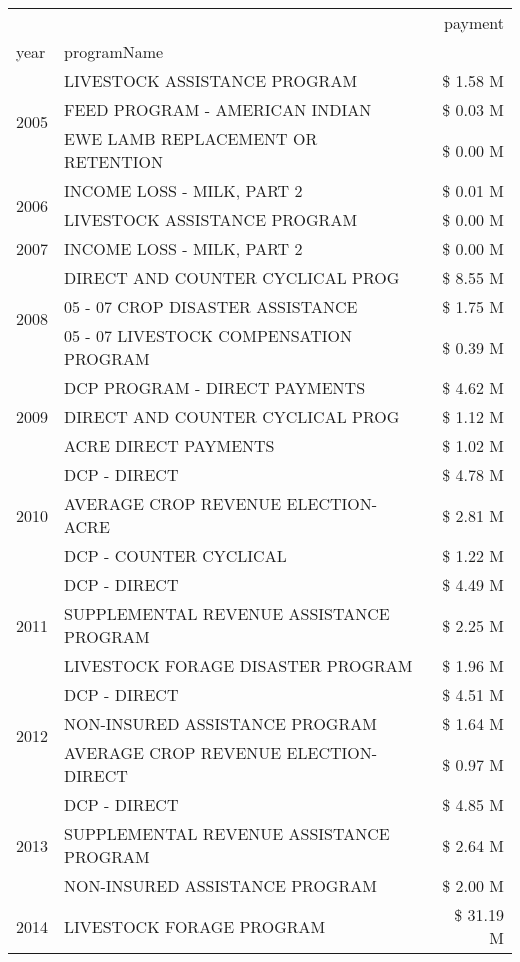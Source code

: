 \begin{tabular}{llr}
\toprule
 &  & payment \\
year & programName &  \\
\midrule
\multirow[t]{3}{*}{2005} & LIVESTOCK ASSISTANCE PROGRAM & \$ 1.58 M \\
 & FEED PROGRAM - AMERICAN INDIAN & \$ 0.03 M \\
 & EWE LAMB REPLACEMENT OR RETENTION & \$ 0.00 M \\
\cline{1-3}
\multirow[t]{2}{*}{2006} & INCOME LOSS - MILK, PART 2 & \$ 0.01 M \\
 & LIVESTOCK ASSISTANCE PROGRAM & \$ 0.00 M \\
\cline{1-3}
2007 & INCOME LOSS - MILK, PART 2 & \$ 0.00 M \\
\cline{1-3}
\multirow[t]{3}{*}{2008} & DIRECT AND COUNTER CYCLICAL PROG & \$ 8.55 M \\
 & 05 - 07 CROP DISASTER ASSISTANCE & \$ 1.75 M \\
 & 05 - 07 LIVESTOCK COMPENSATION PROGRAM & \$ 0.39 M \\
\cline{1-3}
\multirow[t]{3}{*}{2009} & DCP PROGRAM - DIRECT PAYMENTS & \$ 4.62 M \\
 & DIRECT AND COUNTER CYCLICAL PROG & \$ 1.12 M \\
 & ACRE DIRECT PAYMENTS & \$ 1.02 M \\
\cline{1-3}
\multirow[t]{3}{*}{2010} & DCP - DIRECT & \$ 4.78 M \\
 & AVERAGE CROP REVENUE ELECTION-ACRE & \$ 2.81 M \\
 & DCP - COUNTER CYCLICAL & \$ 1.22 M \\
\cline{1-3}
\multirow[t]{3}{*}{2011} & DCP - DIRECT & \$ 4.49 M \\
 & SUPPLEMENTAL REVENUE ASSISTANCE PROGRAM & \$ 2.25 M \\
 & LIVESTOCK FORAGE DISASTER PROGRAM & \$ 1.96 M \\
\cline{1-3}
\multirow[t]{3}{*}{2012} & DCP - DIRECT & \$ 4.51 M \\
 & NON-INSURED ASSISTANCE PROGRAM & \$ 1.64 M \\
 & AVERAGE CROP REVENUE ELECTION-DIRECT & \$ 0.97 M \\
\cline{1-3}
\multirow[t]{3}{*}{2013} & DCP - DIRECT & \$ 4.85 M \\
 & SUPPLEMENTAL REVENUE ASSISTANCE PROGRAM & \$ 2.64 M \\
 & NON-INSURED ASSISTANCE PROGRAM & \$ 2.00 M \\
\cline{1-3}
\multirow[t]{3}{*}{2014} & LIVESTOCK FORAGE PROGRAM & \$ 31.19 M \\

\end{tabular}

